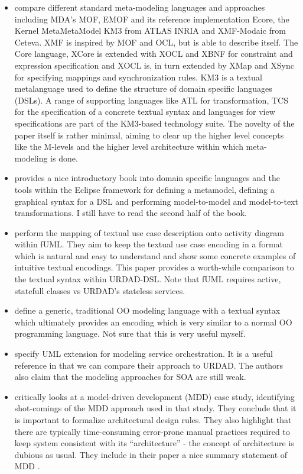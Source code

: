 \begin{itemize}
   \item \cite{mu_specification_2010} compare different standard meta-modeling languages and approaches including MDA's MOF, EMOF and its reference implementation Ecore, the Kernel MetaMetaModel KM3 from ATLAS INRIA and XMF-Modaic from Ceteva. XMF is inspired by MOF and OCL, but is able to describe itself. The Core language, XCore is extended with XOCL and XBNF for constraint and expression specification and XOCL is, in turn extended by XMap and XSync for specifying mappings and synchronization rules. KM3 is a textual metalanguage used to define the structure of domain specific languages (DSLs). A range of supporting languages like ATL for transformation, TCS for the specification of a concrete textual syntax and languages for view specifications are part of the KM3-based technology suite. The novelty of the paper itself is rather minimal, aiming to clear up the higher level concepts like the M-levels and the higher level architecture within which meta-modeling is done.
   \item \cite{gronback_eclipse_2009} provides a nice introductory book into domain specific languages and the tools within the Eclipse framework for defining a metamodel, defining a graphical syntax for a DSL and performing model-to-model and model-to-text transformations. I still have to read the second half of the book.
   \item \cite{lazar_realizing_2010} perform the mapping of textual use case description onto activity diagram within fUML. They aim to keep the textual use case encoding in a format which is natural and easy to understand and show some concrete examples of intuitive textual encodings. This paper provides a worth-while comparison to the textual syntax within URDAD-DSL. Note that fUML requires active, statefull classes vs URDAD's stateless services.
   \item \cite{jinhong_zhao_research_2008} define a generic, traditional OO modeling language with a textual syntax which ultimately provides an encoding which is very similar to a normal OO programming language. Not sure that this is very useful myself.
   \item \cite{mayer_mdd4soa:_2008} specify UML extension for modeling service orchestration. It is a useful reference in that we can compare their approach to URDAD. The authors also claim that the modeling approaches for SOA are still weak.
   \item \cite{mattsson_linking_2009} critically looks at a model-driven development (MDD) case study, identifying shot-comings of the MDD approach used in that study. They conclude that it is important to formalize architectural design rules. They also highlight that there are typically time-consuming error-prone manual practices required to keep system consistent with its ``architecture'' - the concept of architecture is dubious as usual. They include in their paper a nice summary statement of MDD .
  \end{itemize}

